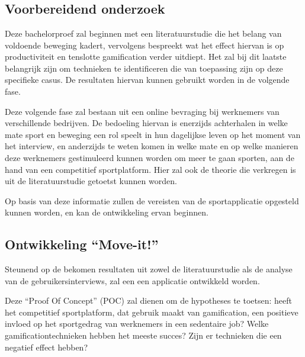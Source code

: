 
\chapter{}%
\label{ch:methodologie}

\section{Voorbereidend onderzoek}
Deze bachelorproef zal beginnen met een literatuurstudie die het belang van voldoende beweging kadert, vervolgens bespreekt wat het effect hiervan is op productiviteit en tenslotte gamification verder uitdiept. Het zal bij dit laatste belangrijk zijn om technieken te identificeren die van toepassing zijn op deze specifieke casus. De resultaten hiervan kunnen gebruikt worden in de volgende fase.

Deze volgende fase zal bestaan uit een online bevraging bij werknemers van verschillende bedrijven. De bedoeling hiervan is enerzijds achterhalen in welke mate sport en beweging een rol speelt in hun dagelijkse leven op het moment van het interview, en anderzijds te weten komen in welke mate en op welke manieren deze werknemers gestimuleerd kunnen worden om meer te gaan sporten, aan de hand van een competitief sportplatform. Hier zal ook de theorie die verkregen is uit de literatuurstudie getoetst kunnen worden.

Op basis van deze informatie zullen de vereisten van de sportapplicatie opgesteld kunnen worden, en kan de ontwikkeling ervan beginnen.

\section{Ontwikkeling ``Move-it!''}

Steunend op de bekomen resultaten uit zowel de literatuurstudie als de analyse van de gebruikersinterviews, zal een een applicatie ontwikkeld worden.

Deze ``Proof Of Concept'' (POC) zal dienen om de hypotheses te toetsen: heeft het competitief sportplatform, dat gebruik maakt van gamification, een positieve invloed op het sportgedrag van werknemers in een sedentaire job? Welke gamificationtechnieken hebben het meeste succes? Zijn er technieken die een negatief effect hebben?

